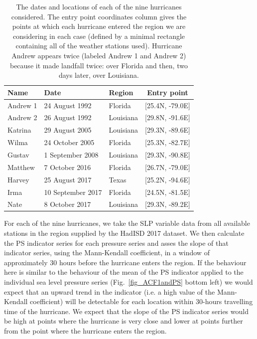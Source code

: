 \documentclass[%
aip,
amsmath,amssymb,
reprint,%
]{revtex4-1}
\begin{document}
\begin{table}
	\centering
	\begin{tabular}{ l  l  l  c }
		\hline
		Name & Date & Region & Entry point\\
		\hline \hline
		Andrew 1 &  24 August 1992 &      Florida     &   [25.4N,    -79.0E]\\
		
		Andrew 2 &  26 August 1992 &      Louisiana  &  [29.8N,  -91.6E]\\
		
		Katrina &   29 August 2005 &     Louisiana &   [29.3N,   -89.6E]\\
		
		Wilma &     24 October 2005 &   Florida     &   [25.3N,    -82.7E]\\
		
		Gustav &  1 September 2008 &   Louisiana & [29.3N,    -90.8E]\\
		
		Matthew &  7 October 2016 & Florida     & [26.7N,    -79.0E]\\
		
		Harvey  &  25 August 2017 &      Texas       &  [25.2N,    -94.6E]\\
		
		Irma &        10 September 2017 & Florida    &  [24.5N,    -81.5E]\\
		
		Nate &       8 October 2017 &    Louisiana &   [29.3N,   -89.2E]\\
		\hline
	\end{tabular}
\caption{The dates and locations of each of the nine hurricanes considered. The entry point coordinates column gives the points at which each hurricane entered the region we are considering in each case (defined by a minimal rectangle containing all of the weather stations used). Hurricane Andrew appears twice (labeled Andrew 1 and Andrew 2) because it made landfall twice: over Florida and then, two days later, over Louisiana.}\label{tab_hurricanes}
\end{table}

For each of the nine hurricanes, we take the SLP variable data from all available stations in the region supplied by the HadISD 2017 dataset. We then calculate the PS indicator series for each pressure series and asses the slope of that indicator series, using the Mann-Kendall coefficient, in a window of approximately 30 hours before the hurricane enters the region. If the behaviour here is similar to the behaviour of the mean of the PS indicator applied to the individual sea level pressure series (Fig.~\ref{fig_ACF1andPS} bottom left) we would expect that an upward trend in the indicator (i.e. a high value of the Mann-Kendall coefficient) will be detectable for each location within 30-hours travelling time of the hurricane. We expect that the slope of the PS indicator series would be high at points where the hurricane is very close and lower at points further from the point where the hurricane enters the region. 
\end{document}
